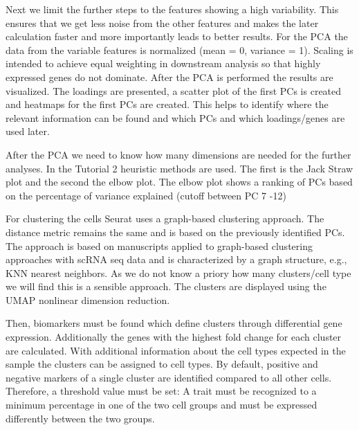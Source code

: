 \documentclass[a4paper, 10pt]{scrartcl}
\begin{document}
Next we limit the further steps to the features showing a high
variability. This ensures that we get less noise from the other features
and makes the later calculation faster and more importantly leads to
better results. For the PCA the data from the variable features is
normalized (mean = 0, variance = 1). Scaling is intended to achieve
equal weighting in downstream analysis so that highly expressed genes do
not dominate. After the PCA is performed the results are visualized. The
loadings are presented, a scatter plot of the first PCs is created and
heatmaps for the first PCs are created. This helps to identify where the
relevant information can be found and which PCs and which loadings/genes
are used later.

\hypertarget{determine-dimensionality-of-dataset}{%
\label{determine-dimensionality-of-dataset}}

After the PCA we need to know how many dimensions are needed for the
further analyses. In the Tutorial 2 heuristic methods are used. The
first is the Jack Straw plot and the second the elbow plot. The elbow
plot shows a ranking of PCs based on the percentage of variance
explained (cutoff between PC 7 -12)

\hypertarget{cluster-the-cells}{%
\label{cluster-the-cells}}

For clustering the cells Seurat uses a graph-based clustering approach.
The distance metric remains the same and is based on the previously
identified PCs. The approach is based on manuscripts applied to
graph-based clustering approaches with scRNA seq data and is
characterized by a graph structure, e.g., KNN nearest neighbors. As we
do not know a priory how many clusters/cell type we will find this is a
sensible approach. The clusters are displayed using the UMAP nonlinear
dimension reduction.

\hypertarget{finding-differentially-expressed-features}{%
\label{finding-differentially-expressed-features}}

Then, biomarkers must be found which define clusters through
differential gene expression. Additionally the genes with the highest
fold change for each cluster are calculated. With additional information
about the cell types expected in the sample the clusters can be assigned
to cell types. By default, positive and negative markers of a single
cluster are identified compared to all other cells. Therefore, a
threshold value must be set: A trait must be recognized to a minimum
percentage in one of the two cell groups and must be expressed
differently between the two groups.
\end{document}

